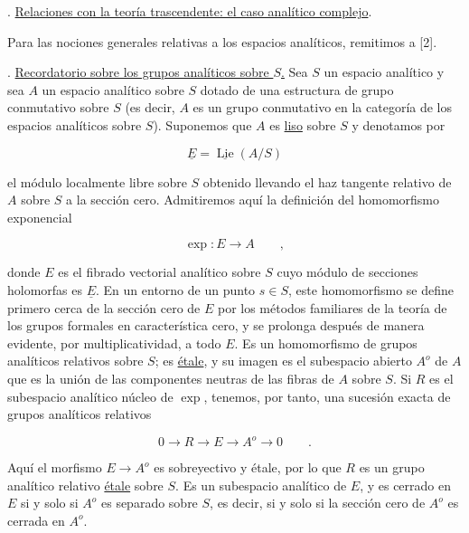 
\medskip
{}. \underline{Relaciones con la teoría trascendente: el caso analítico
complejo}.

Para las nociones generales relativas a los espacios analíticos,
remitimos a [2].

\medskip
{}. \underline{Recordatorio sobre los grupos analíticos sobre $S$.}
Sea $S$ un espacio analítico y sea $A$ un espacio analítico sobre $S$
dotado de una estructura de grupo conmutativo sobre $S$ (es decir, $A$
es un grupo conmutativo en la categoría de los espacios analíticos sobre
$S$). Suponemos que $A$ es \underline{liso} sobre $S$ y denotamos por


\begin{equation}\tag{13.1.1}
 \underline E=\underline{\operatorname{Lie}}(A/S)
\end{equation}

\noindent
el módulo localmente libre sobre $S$ obtenido llevando el haz tangente
relativo de $A$ sobre $S$ a la sección cero. Admitiremos aquí la
definición del homomorfismo exponencial

\begin{equation}\tag{13.1.2}
 \exp:E\longrightarrow A\qquad ,
\end{equation}

\noindent
donde $E$ es el fibrado vectorial analítico sobre $S$ cuyo módulo de
secciones holomorfas es $\underline E$. En un entorno de un punto
$s\in S$, este homomorfismo se define primero cerca de la sección cero de
$E$ por los métodos familiares de la teoría de los grupos formales en
característica cero, y se prolonga después de manera evidente, por
multiplicatividad, a todo $E$. Es un homomorfismo de grupos analíticos
relativos sobre $S$; es \underline{étale}, y su imagen es el subespacio
abierto $A^o$ de $A$ que es la unión de las componentes neutras de las
fibras de $A$ sobre $S$. Si $R$ es el subespacio analítico núcleo de
$\exp$, tenemos, por tanto, una sucesión exacta de grupos analíticos
relativos

\begin{equation}\tag{13.1.3}
 0\longrightarrow R\longrightarrow E\longrightarrow A^o
 \longrightarrow0\qquad .
\end{equation}

\noindent
Aquí el morfismo $E\longrightarrow A^o$ es sobreyectivo y étale, por lo
que $R$ es un grupo analítico relativo \underline{étale} sobre $S$. Es
un subespacio analítico de $E$, y es cerrado en $E$ si y solo si $A^o$
es separado sobre $S$, es decir, si y solo si la sección cero de $A^o$
es cerrada en $A^o$.

